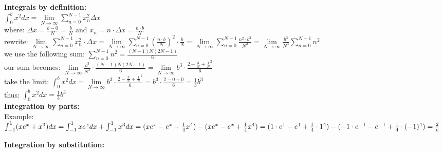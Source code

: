 \documentclass[12pt,a4paper]{report}
\begin{document}
	\textbf{Integrals by definition:}\\
	$\int_{0}^{b} x^2dx = \lim\limits_{N \to \infty} \sum_{n = 0}^{N - 1} x^2_n \Delta x$\\
	where:
	$\Delta x = \frac{b - 0}{N} = \frac{b}{N}$ and $x_n = n \cdot \Delta x = \frac{n \cdot b}{N}$\\
	rewrite:
	$\lim\limits_{N \to \infty}\sum_{n = 0}^{N - 1} x^2_n \cdot \Delta x = \lim\limits_{N \to \infty} \sum_{n = 0}^{N - 1} (\frac{n \cdot b}{N})^2 \cdot \frac{b}{N} = \lim\limits_{N \to \infty} \sum_{n = 0}^{N - 1} \frac{n^2 \cdot b^3}{N^3} = \lim\limits_{N \to \infty} \frac{b^3}{N^3} \sum_{n = 0}^{N - 1} n^2$\\
	we use the following sum:
	$\sum_{n = 0}^{N - 1} n^2 = \frac{(N-1)N(2N-1)}{6}$\\
	our sum becomes:
	$\lim\limits_{N \to \infty} \frac{b^3}{N^3} \cdot \frac{(N -1) N (2N - 1)}{6} = \lim\limits_{N \to \infty} b^3 \cdot \frac{2 - \frac{3}{N} + \frac{1}{N}^2}{6}$\\
	take the limit:
	$\int_{0}^{b} x^2 dx = \lim\limits_{N \to \infty} b^3 \cdot \frac{2 - \frac{3}{N} + \frac{1}{N}^2}{6} = b^3 \cdot \frac{2 - 0 + 0}{6} = \frac{1}{3}b^3$\\
	thus: $\int_{0}^{b} x^2 dx = \frac{1}{3} b^3$\\

	\textbf{Integration by parts:}\\
	Example:\\
	$\int_{-1}^{1}(xe^{x}+x^{3})dx=\int_{-1}^{1}xe^{x}dx+\int_{-1}^{1}x^{3}dx\\
	=(xe^{x}-e^{x}+\frac{1}{4}x^{4})-(xe^{x}-e^{x}+\frac{1}{4}x^{4})\\
	=(1\cdot e^{1}-e^{1}+\frac{1}{4}\cdot 1^{4})-(-1\cdot e^{-1}-e^{-1}+\frac{1}{4}\cdot(-1)^{4})=\frac{2}{e}$
	
	\textbf{Integration by substitution:}\\
	
\end{document}
